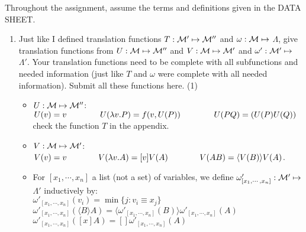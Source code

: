 \documentclass[11pt]{article}
\newcommand \cM {\cal M}
\begin{document}
\date{}

\maketitle


Throughout the assignment, assume the terms and definitions given in the DATA SHEET.



\begin{enumerate}
	  
	
	\item
	      Just like I defined translation functions  $T:\cM'\mapsto \cM''$ and  $\omega: \cM\mapsto$ $\Lambda$, give translation functions from
	      $U:\cM\mapsto \cM''$ and  $V:\cM\mapsto\cM'$ and  $\omega':\cM'\mapsto$ $\Lambda'$.   Your translation functions need to be complete with all subfunctions and needed information (just like $T$ and $\omega$ were complete with all needed information).   Submit all these functions here.
	      \hfill{(1)} %
	      \color{red}
	      \begin{itemize}
	      	\item
	      	      $U:{\cal M} \mapsto {\cal M}''$:\\
	      	      $U(v) = v      \hspace{0.5in} \: \: U(\lambda v. P) =f(v, U(P))  \: \: \hspace{0.5in}  U(PQ) = (U(P)U(Q))$\\
	      	      check the function $T$ in the appendix.
	      	\item
	      	      $V: {\cal M} \mapsto {\cal M}'$:\\
	      	      $V(v) = v \hspace{0.5in} \: V(\lambda v.A) = [v]V(A) \hspace{0.5in} \: V(AB) = \langle V(B)\rangle V(A)$.
	      	\item
	      	      For $[x_1,\cdots, x_n]$ a list (not a set) of variables, 
	      	      we define $\omega'_{[x_1,\cdots, x_n]}: \cM' \mapsto$ $\Lambda'$ inductively by:\\
	      	      $\omega'_{[x_1,\cdots, x_n]}(v_i) = \min\{j:v_i \equiv x_j\}$\\
	      	      $\omega'_{[x_1,\cdots, x_n]}(\langle B \rangle A) = \langle\omega'_{[x_1,\cdots, x_n]}(B)\rangle \omega'_{[x_1,\cdots, x_n]}(A)$\\
	      	      $ \omega'_{[x_1,\cdots, x_n]}([x]A)=[]\omega'_{[x_1,\cdots, x_n]}(A)$
	      	      

\end{itemize}
\end{enumerate}
\end{document}
